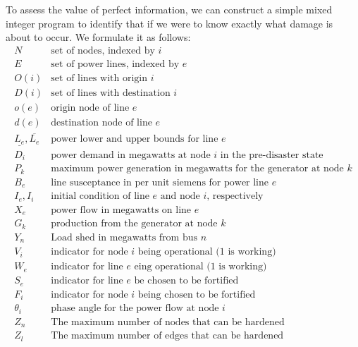 \documentclass{article}
\begin{document}
	To assess the value of perfect information, we can construct a simple mixed integer program to identify that if we were to know exactly what damage is about to occur. We formulate it as follows:
	\small
	\begin{displaymath}
	\begin{array}{ll}
	N & \mbox{set of nodes, indexed by $i$} \\
	E & \mbox{set of power lines, indexed by $e$}\\
	O(i) & \mbox{set of lines with origin $i$} \\
	D(i) & \mbox{set of lines with destination $i$} \\
	o(e) & \mbox{origin node of line $e$} \\
	d(e) & \mbox{destination node of line $e$} \\
	\underline{L_e},\overline{L_e} & \mbox{power lower and upper bounds for line $e$}\\
	D_i & \mbox{power demand in megawatts at node $i$ in the pre-disaster state}\\
	P_k & \mbox{maximum power generation in megawatts for the generator at node $k$}\\
	B_e &  \mbox{line susceptance in per unit siemens for power line $e$}\\
	I_e, I_i & \mbox{initial condition of line $e$ and node $i$, respectively}\\
	X_{e} & \mbox{power flow in megawatts on line $e$}\\
	G_{k} & \mbox{production from the generator at node $k$}\\
	Y_{n} & \mbox{Load shed in megawatts from bus $n$}\\ 
	V_i & \mbox{indicator for node $i$ being operational (1 is working) }\\
	W_{e} & \mbox{indicator for line $e$ eing operational (1 is working) }\\
	S_{e} & \mbox{indicator for line $e$ be chosen to be fortified}\\
	F_i & \mbox{indicator for node $i$ being chosen to be fortified}\\
	\theta_i & \mbox{phase angle for the power flow at node $i$}\\
	Z_n & \mbox{The maximum number of nodes that can be hardened}\\
	Z_l & \mbox{The maximum number of edges that can be hardened}\\
	\end{array}
	\end{displaymath}
\end{document}

